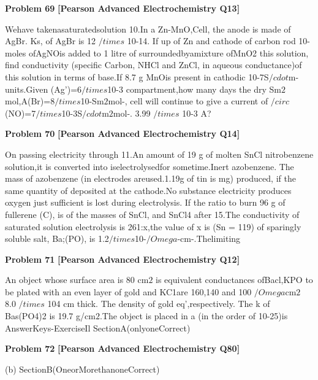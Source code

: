 \begin{problembox}
\textbf{Problem 69} \hfill \textbf{[Pearson Advanced Electrochemistry Q13]}
\label{q:ext-pearson-69}

Wehave takenasaturatedsolution
10.In a Zn-MnO,Cell, the anode is made
of AgBr. Ks, of AgBr is 12 $/times$ 10-14. If
up of Zn and cathode of carbon rod
10-moles ofAgNOis added to 1 litre of
surroundedbyamixture ofMnO2
this solution, find conductivity (specific
Carbon, NHCl and ZnCl, in aqueous
conductance)of this solution in terms of
base.If 8.7 g MnOis present in cathodic
10-7S$/cdot$m- units.Given  (Ag')=6$/times$10-3
compartment,how many days the dry
Sm$2$mol,A(Br)=8$/times$10-Sm$2$mol-,
cell will continue to give a current of
$/circ$(NO)=7$/times$10-3S$/cdot$m$2$mol-.
3.99 $/times$ 10-3 A?
\end{problembox}

\begin{problembox}
\textbf{Problem 70} \hfill \textbf{[Pearson Advanced Electrochemistry Q14]}
\label{q:ext-pearson-70}

On
passing
electricity
through
11.An amount of 19 g of molten SnCl
nitrobenzene solution,it is converted into
iselectrolysedfor sometime.Inert
azobenzene. The mass of azobenzene (in
electrodes areused.1.19g of tin is
mg) produced, if the same quantity of
deposited at the cathode.No substance
electricity produces oxygen just sufficient
is lost during electrolysis. If the ratio
to burn 96 g of fullerene (C), is
of the masses of SnCl, and SnCl4 after
15.The conductivity of saturated solution
electrolysis is 261:x,the value of x is
(Sn = 119)
of sparingly soluble salt, Ba;(PO),  is
1.2$/times$10-$/Omega$-cm-.Thelimiting
\end{problembox}

\begin{problembox}
\textbf{Problem 71} \hfill \textbf{[Pearson Advanced Electrochemistry Q12]}
\label{q:ext-pearson-71}

An object whose surface area is 80 cm$2$ is
equivalent conductances ofBacl,KPO
to be plated with an even layer of gold
and KC1are 160,140 and 100 $/Omega$cm$2$
8.0 $/times$ 104 cm thick. The density of gold
eq',respectively. The k of Bas(PO4)2
is 19.7 g/cm$2$.The object is placed in a
(in the order of 10-25)is
AnswerKeys-ExerciseIl
SectionA(onlyoneCorrect)
\end{problembox}

\begin{problembox}
\textbf{Problem 72} \hfill \textbf{[Pearson Advanced Electrochemistry Q80]}
\label{q:ext-pearson-72}

(b)
SectionB(OneorMorethanoneCorrect)
\end{problembox}

